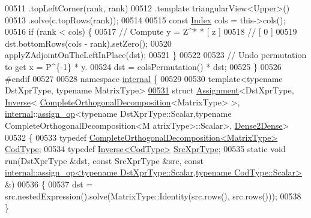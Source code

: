 \begin{DoxyCode}
00511                           .topLeftCorner(rank, rank)
00512                           .template triangularView<Upper>()
00513                           .solve(c.topRows(rank));
00514 
00515   \textcolor{keyword}{const} \hyperlink{namespace_eigen_a62e77e0933482dafde8fe197d9a2cfde}{Index} cols = this->cols();
00516   \textcolor{keywordflow}{if} (rank < cols) \{
00517     \textcolor{comment}{// Compute y = Z^* * [ z ]}
00518     \textcolor{comment}{//                   [ 0 ]}
00519     dst.bottomRows(cols - rank).setZero();
00520     applyZAdjointOnTheLeftInPlace(dst);
00521   \}
00522 
00523   \textcolor{comment}{// Undo permutation to get x = P^\{-1\} * y.}
00524   dst = colsPermutation() * dst;
00525 \}
00526 \textcolor{preprocessor}{#endif}
00527 
00528 \textcolor{keyword}{namespace }\hyperlink{namespaceinternal}{internal} \{
00529 
00530 \textcolor{keyword}{template}<\textcolor{keyword}{typename} DstXprType, \textcolor{keyword}{typename} MatrixType>
\hyperlink{struct_eigen_1_1internal_1_1_assignment_3_01_dst_xpr_type_00_01_inverse_3_01_complete_orthogonalcd5d352c5ea4dcae855a0a56ba39cbfd}{00531} \textcolor{keyword}{struct }\hyperlink{struct_eigen_1_1internal_1_1_assignment}{Assignment}<DstXprType, \hyperlink{class_eigen_1_1_inverse}{Inverse}<
      \hyperlink{group___q_r___module_class_eigen_1_1_complete_orthogonal_decomposition}{CompleteOrthogonalDecomposition}<MatrixType> >, 
      \hyperlink{namespaceinternal}{internal}::\hyperlink{struct_eigen_1_1internal_1_1assign__op}{assign\_op}<typename DstXprType::Scalar,typename CompleteOrthogonalDecomposition<M
      atrixType>::Scalar>, \hyperlink{struct_eigen_1_1internal_1_1_dense2_dense}{Dense2Dense}>
00532 \{
00533   \textcolor{keyword}{typedef} \hyperlink{group___q_r___module_class_eigen_1_1_complete_orthogonal_decomposition}{CompleteOrthogonalDecomposition<MatrixType>} 
      \hyperlink{group___q_r___module_class_eigen_1_1_complete_orthogonal_decomposition}{CodType};
00534   \textcolor{keyword}{typedef} \hyperlink{class_eigen_1_1_inverse}{Inverse<CodType>} \hyperlink{class_eigen_1_1_inverse}{SrcXprType};
00535   \textcolor{keyword}{static} \textcolor{keywordtype}{void} run(DstXprType &dst, \textcolor{keyword}{const} SrcXprType &src, \textcolor{keyword}{const} 
      \hyperlink{struct_eigen_1_1internal_1_1assign__op}{internal::assign\_op<typename DstXprType::Scalar,typename CodType::Scalar>}
       &)
00536   \{
00537     dst = src.nestedExpression().solve(MatrixType::Identity(src.rows(), src.rows()));
00538   \}

\end{DoxyCode}

